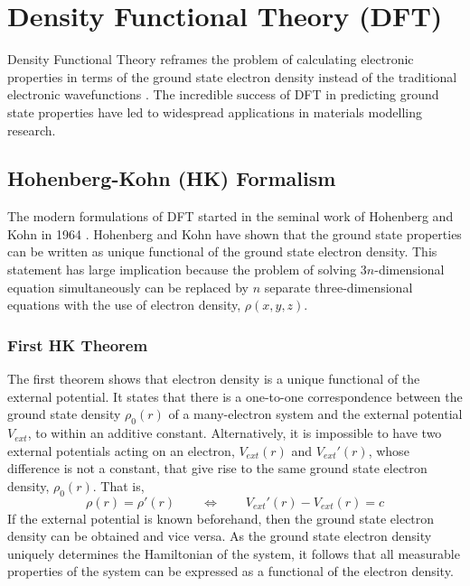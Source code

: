 \section{Density Functional Theory (DFT)}
Density Functional Theory reframes the problem of calculating electronic properties in terms of the ground state electron density instead of the traditional electronic wavefunctions \citep{Kohn1999}. The incredible success of DFT in predicting ground state properties have led to widespread applications in materials modelling research. 

    
 \subsection{Hohenberg-Kohn (HK) Formalism}
 The modern formulations of DFT started in the seminal work of Hohenberg and Kohn in 1964 \citep{Hohenberg1964}. Hohenberg and Kohn have shown that the ground state properties can be written as unique functional of the ground state electron density. This statement has large implication because the problem of solving 3$n$-dimensional equation simultaneously can be replaced by $n$ separate three-dimensional equations with the use of electron density, $\rho(x,y,z)$. 
    \subsubsection{First HK Theorem}
    The first theorem shows that electron density is a unique functional of the external potential. It states that there is a one-to-one correspondence between the ground state density $\rho_0(r)$ of a many-electron system and the external potential $V_{ext}$, to within an additive constant. Alternatively, it is impossible to have two external potentials acting on an electron, $V_{ext}(r)$ and $V_{ext}'(r)$, whose difference is not a constant, that give rise to the same ground    state electron density, $\rho_0(r)$. That is,  
\begin{equation}
    \rho(r) = \rho'(r) \quad \quad \Longleftrightarrow \quad \quad V_{ext}'(r) - V_{ext}(r) = c
\end{equation}
If the external potential is known beforehand, then the ground state electron density can be obtained and vice versa. As the ground state electron density uniquely determines the Hamiltonian of the system, it follows that all measurable properties of the system can be expressed as a functional of the electron density. 
